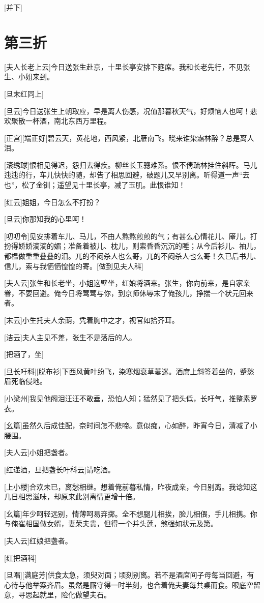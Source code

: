 \documentclass{book}
\newcommand\nchapter[1]{\chapter*{#1}\markboth{#1}{}\addcontentsline{toc}{chapter}{#1}}
\begin{document}
[并下]

\nchapter{第三折}

[夫人长老上云]今日送张生赴京，十里长亭安排下筵席。我和长老先行，不见张生、小姐来到。

[旦末红同上]

[旦云]今日送张生上朝取应，早是离人伤感，况值那暮秋天气，好烦恼人也呵！悲欢聚散一杯酒，南北东西万里程。

[正宫][端正好]碧云天，黄花地，西风紧，北雁南飞。晓来谁染霜林醉？总是离人泪。

[滚绣球]恨相见得迟，怨归去得疾。柳丝长玉骢难系。恨不倩疏林挂住斜晖。马儿迍迍的行，车儿快快的随，却告了相思回避，破题儿又早别离。听得道一声``去也''，松了金钏；遥望见十里长亭，减了玉肌。此恨谁知！

[红云]姐姐，今日怎么不打扮？

[旦云]你那知我的心里呵！

[叨叨令]见安排着车儿、马儿，不由人熬熬煎煎的气；有甚么心情花儿、厣儿，打扮得娇娇滴滴的媚；准备着被儿、枕儿，则索昏昏沉沉的睡；从今后衫儿、袖儿，都榅做重重叠叠的泪。兀的不闷杀人也么哥，兀的不闷杀人也么哥！久已后书儿、信儿，索与我恓恓惶惶的寄。[做到见夫人科]

[夫人云]张生和长老坐，小姐这壁坐，红娘将酒来。张生，你向前来，是自家亲眷，不要回避。俺今日将莺莺与你，到京师休辱末了俺孩儿，挣揣一个状元回来者。

[末云]小生托夫人余荫，凭着胸中之才，视官如拾芥耳。

[洁云]夫人主见不差，张生不是落后的人。

[把酒了，坐]

[旦长吁科][脱布衫]下西风黄叶纷飞，染寒烟衰草萋迷。酒席上斜签着坐的，蹙愁眉死临侵地。

[小梁州]我见他阁泪汪汪不敢垂，恐怕人知；猛然见了把头低，长吁气，推整素罗衣。

[幺篇]虽然久后成佳配，奈时间怎不悲啼。意似痴，心如醉，昨宵今日，清减了小腰围。

[夫人云]小姐把盏者。

[红递酒，旦把盏长吁科云]请吃酒。

[上小楼]合欢未已，离愁相继。想着俺前暮私情，昨夜成亲，今日别离。我谂知这几日相思滋味，却原来此别离情更增十倍。

[幺篇]年少呵轻远别，情薄呵易弃掷。全不想腿儿相挨，脸儿相偎，手儿相携。你与俺崔相国做女婿，妻荣夫贵，但得一个并头莲，煞强如状元及第。

[夫人云]红娘把盏者。

[红把酒科]

[旦唱][满庭芳]供食太急，须臾对面；顷刻别离。若不是酒席间子母每当回避，有心待与他举案齐眉。虽然是厮守得一时半刻，也合着俺夫妻每共桌而食。眼底空留意，寻思起就里，险化做望夫石。
\end{document}
